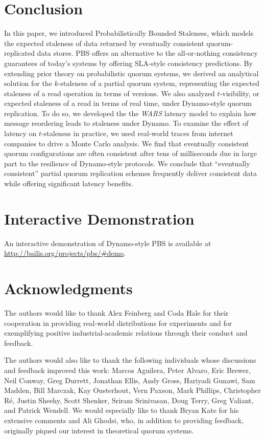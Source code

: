 \documentclass{vldb}
\newcommand{\sectionskip}{-0em}
\begin{document}
\vspace{\sectionskip}\section{Conclusion}
\label{sec:conclusion}

In this paper, we introduced Probabilistically Bounded Staleness,
which models the expected staleness of data returned by eventually
consistent quorum-replicated data stores.  PBS offers an alternative
to the all-or-nothing consistency guarantees of today's systems by
offering SLA-style consistency predictions. By extending prior theory on
probabilistic quorum systems, we derived an analytical solution for
the $k$-staleness of a partial quorum system, representing the
expected staleness of a read operation in terms of versions.  We also
analyzed $t$-visibility, or expected staleness of a read in terms of
real time, under Dynamo-style quorum replication.  To do so, we
developed the the \textit{WARS} latency model to explain how message
reordering leads to staleness under Dynamo.  To examine the effect of
latency on $t$-staleness in practice, we used real-world traces from
internet companies to drive a Monte Carlo analysis.  We find that
eventually consistent quorum configurations are often consistent after
tens of milliseconds due in large part to the resilience of
Dynamo-style protocols.  We conclude that ``eventually consistent''
partial quorum replication schemes frequently deliver consistent data
while offering significant latency benefits.

\vspace{\sectionskip}\section*{Interactive Demonstration} An
interactive demonstration of Dynamo-style PBS is available at
\url{http://bailis.org/projects/pbs/#demo}.

\section*{Acknowledgments}

The authors would like to thank Alex Feinberg and Coda Hale for their
cooperation in providing real-world distributions for experiments and
for exemplifying positive industrial-academic relations through their
conduct and feedback.

The authors would also like to thank the following individuals whose
discussions and feedback improved this work: Marcos Aguilera, Peter
Alvaro, Eric Brewer, Neil Conway, Greg Durrett, Jonathan Ellis, Andy
Gross, Hariyadi Gunawi, Sam Madden, Bill Marczak, Kay Ousterhout, Vern
Paxson, Mark Phillips, Christopher R\'e, Justin Sheehy, Scott Shenker,
Sriram Srinivasan, Doug Terry, Greg Valiant, and Patrick Wendell.  We
would especially like to thank Bryan Kate for his extensive comments
and Ali Ghodsi, who, in addition to providing feedback, originally
piqued our interest in theoretical quorum systems.
\end{document}
